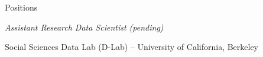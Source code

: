 \begin{rubric}{Positions}

\entry*[2013--present] \emph{Assistant Research Data Scientist (pending)}
\par Social Sciences Data Lab (D-Lab) -- University of California, Berkeley

\end{rubric}

